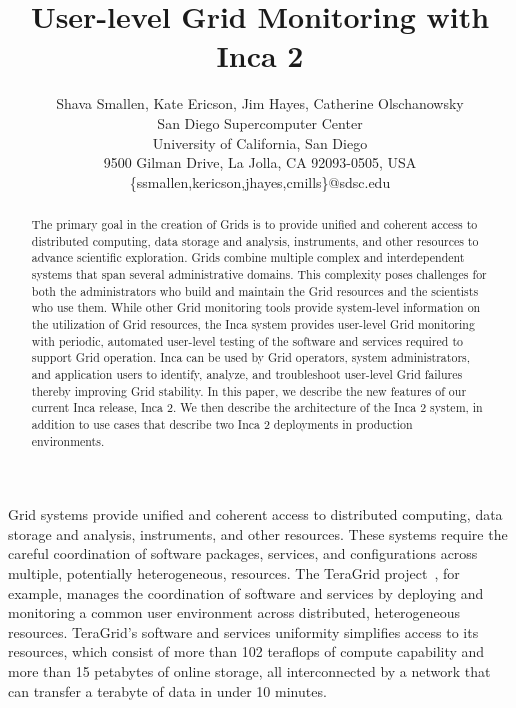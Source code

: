 \documentclass[times,10pt,twocolumn]{article}
\begin{document}
\title{User-level Grid Monitoring with Inca 2}

\author{Shava Smallen, Kate Ericson, Jim Hayes, Catherine Olschanowsky \\
San Diego Supercomputer Center\\ University of California, San Diego\\ 
9500 Gilman Drive, La Jolla, CA 92093-0505, USA\\ 
\{ssmallen,kericson,jhayes,cmills\}@sdsc.edu\\
}

\maketitle
\thispagestyle{empty}


\begin{abstract}
The primary goal in the creation of Grids is to provide unified and coherent
access to distributed computing, data storage and analysis, instruments, and
other resources to advance scientific exploration.  Grids combine multiple
complex and interdependent systems that span several administrative domains.
This complexity poses challenges for both the administrators who build and
maintain the Grid resources and the scientists who use them.  While other Grid
monitoring tools provide system-level information on the utilization of Grid
resources, the Inca system provides user-level Grid monitoring with periodic,
automated user-level testing of the software and services required to support
Grid operation.  Inca can be used by Grid operators, system administrators,
and application users to identify, analyze, and troubleshoot user-level Grid
failures thereby improving Grid stability.  In this paper, we describe the new
features of our current Inca release, Inca 2.  We then describe the
architecture of the Inca 2 system, in addition to use cases that describe two
Inca 2 deployments in production environments.  
\end{abstract}

\label{intro}

Grid systems provide unified and coherent access to distributed computing,
data storage and analysis, instruments, and other resources.  These systems
require the careful coordination of software packages, services, and
configurations across multiple, potentially heterogeneous, resources.  The TeraGrid
project~\cite{teragrid}, for example, manages the coordination of software and
services by deploying and monitoring a common user environment across
distributed, heterogeneous resources. 
TeraGrid's software and services uniformity simplifies access to its
resources, which consist of more than 102 teraflops of compute capability and
more than 15 petabytes of online storage, all interconnected by a network that
can transfer a terabyte of data in under 10 minutes.  
\end{document}
